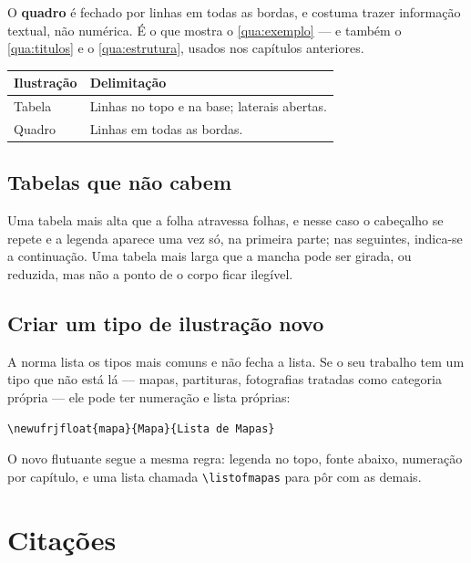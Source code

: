 \documentclass[dsc]{ufrj}
\begin{document}
  O \textbf{quadro} é fechado por linhas em todas as bordas, e costuma trazer
  informação textual, não numérica. É o que mostra o \autoref{qua:exemplo} --- e
  também o \autoref{qua:titulos} e o \autoref{qua:estrutura}, usados nos
  capítulos anteriores.

  \begin{framefloat}[ht]
    \centering
    \caption{Exemplo de quadro, fechado em todas as bordas}
    \label{qua:exemplo}
    \begin{tabular}{|l|l|}
      \hline
      \textbf{Ilustração} & \textbf{Delimitação} \\
      \hline
      Tabela & Linhas no topo e na base; laterais abertas. \\
      \hline
      Quadro & Linhas em todas as bordas. \\
      \hline
    \end{tabular}
  \end{framefloat}

  \section{Tabelas que não cabem}

  Uma tabela mais alta que a folha atravessa folhas, e nesse caso o cabeçalho se
  repete e a legenda aparece uma vez só, na primeira parte; nas seguintes, indica-se
  a continuação. Uma tabela mais larga que a mancha pode ser girada, ou reduzida,
  mas não a ponto de o corpo ficar ilegível.

  \section{Criar um tipo de ilustração novo}

  A norma lista os tipos mais comuns e não fecha a lista. Se o seu trabalho tem
  um tipo que não está lá --- mapas, partituras, fotografias tratadas como
  categoria própria --- ele pode ter numeração e lista próprias:

\begin{verbatim}
\newufrjfloat{mapa}{Mapa}{Lista de Mapas}
\end{verbatim}

  O novo flutuante segue a mesma regra: legenda no topo, fonte abaixo, numeração
  por capítulo, e uma lista chamada \verb|\listofmapas| para pôr com as demais.

  \chapter{Citações}
\end{document}
